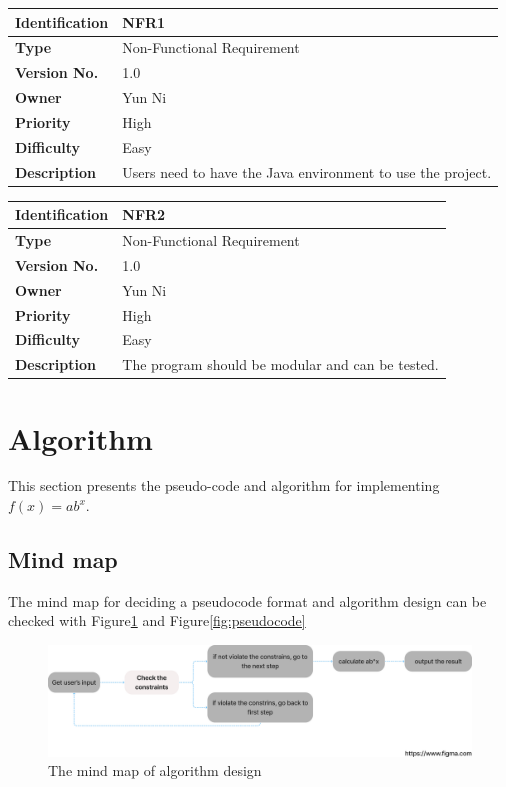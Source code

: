 \documentclass[11pt]{article}
\begin{document}
\begin{center}
    \begin{tabular}{|p{3cm}|p{11cm}| }
    \hline
    \textbf{Identification} &  NFR1 \\ \hline 
    \textbf{Type} & Non-Functional Requirement\\ \hline
    \textbf{Version No.} &  1.0 \\ \hline 
    \textbf{Owner} &  Yun Ni \\ \hline 
    \textbf{Priority} & High  \\ \hline
    \textbf{Difficulty} & Easy  \\ \hline
    \textbf{Description} & Users need to have the Java environment to use the project.\\ \hline
\end{tabular}
\end{center}

\begin{center}
    \begin{tabular}{|p{3cm}|p{11cm}| }
    \hline
    \textbf{Identification} &  NFR2 \\ \hline 
    \textbf{Type} & Non-Functional Requirement\\ \hline
    \textbf{Version No.} &  1.0 \\ \hline 
    \textbf{Owner} &  Yun Ni \\ \hline 
    \textbf{Priority} & High  \\ \hline
    \textbf{Difficulty} & Easy  \\ \hline
    \textbf{Description} & The program should be modular and can be tested.\\ \hline
\end{tabular}
\end{center}

\section{Algorithm}\label{problem3}
This section presents the pseudo-code and algorithm for implementing $f(x)=ab^x$.
\subsection{Mind map}
The mind map for deciding a pseudocode format and algorithm design can be checked with Figure\ref{fig:mind} and Figure\ref{fig:pseudocode}

\begin{figure}[h]
    \centering
    \includegraphics[width=13cm]{images/mindmap.jpeg}
    \caption{The mind map of algorithm design}
    \label{fig:mind}
\end{figure}
\end{document}
